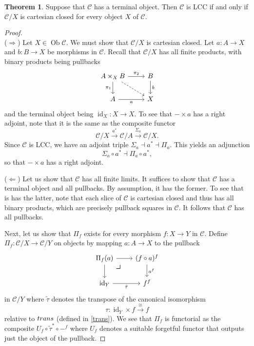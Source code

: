 \documentclass[10pt,letterpaper,cm]{nupset}
\theoremstyle{definition}
\theoremstyle{theorem}
\newtheorem{theorem}[definition]{Theorem}
\theoremstyle{remark}
\DeclareMathOperator{\ob}{Ob}
\newcommand{\0}{\mathbf{0}}
\newcommand{\1}{\mathbf{1}}
\newcommand{\2}{\mathbf{2}}
\renewcommand{\c}{\mathscr{C}}
\DeclareMathOperator{\idd}{id}
\DeclareMathOperator{\trans}{\mathnormal{trans}}
\begin{document}
\begin{theorem}\label{slicecc}
Suppose that $\c$ has a terminal object. Then $\c$ is LCC if and only if $\c/X$ is cartesian closed for every object $X$ of $\c$.
\end{theorem}
\begin{proof} $ $\\
($\Longrightarrow$) Let $X\in \ob{\c}$. We must show that $\c/X$ is cartesian closed. Let $a: A \to X$ and $b: B \to X$ be morphisms in $\c$. Recall that $\c/X$ has all finite products, with binary products being pullbacks
\[
\begin{tikzcd}
A\times_X B \arrow[d, "\pi_1"'] \arrow[r, "\pi_2"] \arrow[rd, dashed] & B \arrow[d, "b"] \\
A \arrow[r, "a"']                                                     & X               
\end{tikzcd}
\] and the terminal object being $\idd_X : X \to X$. To see that ${-} \times a$ has a right adjoint, note that it is the same as the composite functor $$ \c/X \overset{a^{\ast}}{\longrightarrow} \c/A \overset{\Sigma_a}{\longrightarrow} \c/X    .$$ Since $\c$ is LCC, we have an adjoint triple $\Sigma_a \dashv a^{\ast} \dashv \Pi_a$. This yields an adjunction $$\Sigma_a \circ a^{\ast} \dashv \Pi_a \circ a^{\ast},$$ so that ${-} \times a$ has a right adjoint.

\medskip
($\Longleftarrow$) Let us show that $\c$ has all finite limits. It suffices to show that $\c$ has a terminal object and all pullbacks. By assumption, it has the former. To see that is has the latter, note that each slice of $\c$ is cartesian closed and thus has all binary products, which are precisely pullback squares in $\c$. It follows that $\c$ has all pullbacks. 

\smallskip

Next, let us show that $\Pi_f$ exists for every morphism $f: X \to Y$ in $\c$. Define $\Pi_f : \c/X \to \c/Y$ on objects by mapping $a : A \to X$ to the pullback
\[
\begin{tikzcd}
\Pi_f(a) \arrow[d] \arrow[r]        
\arrow[dr, phantom, "\scalebox{1.5}{\color{black}$\lrcorner$}" , very near start, color=black]
& (f\circ a)^f \arrow[d, "a^f"] \\
\idd_Y \arrow[r, "\tilde{\tau}"'] & f^f                          
\end{tikzcd}
\] in $ \c/Y   $   where $\tilde{\tau}$ denotes the transpose of  the canonical isomorphism $$\tau: \idd_Y \times f \overset{\cong}{\longrightarrow}  f$$ relative to $\trans$ (defined in \cref{trans}). We see that $\Pi_f$ is functorial as the composite $U_f \circ \tilde{\tau}^{\ast} \circ {-}^f$ where $U_f$ denotes a suitable forgetful functor that outputs just the object of the pullback. 


\end{proof}
\end{document}
